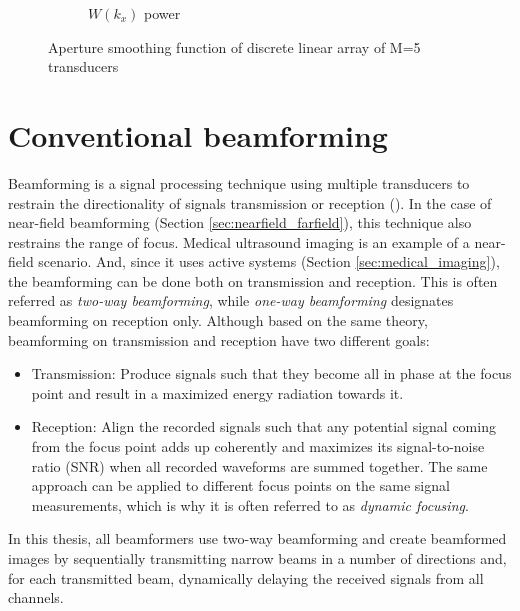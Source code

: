 \begin{figure}[ht]
\begin{subfigure}[b]{0.48\linewidth}
        \caption{$W(k_x)$ power}
    \end{subfigure}
	\caption{Aperture smoothing function of discrete linear array of M=5 transducers}
	\label{fig:total_aperture}
\end{figure}


\section{Conventional beamforming}
\label{sec:beamforming}
Beamforming is a signal processing technique using multiple transducers to restrain the directionality of signals transmission or reception (\cite{DAS}). In the case of near-field beamforming (Section \ref{sec:nearfield_farfield}), this technique also restrains the range of focus. Medical ultrasound imaging is an example of a near-field scenario. And, since it uses active systems (Section \ref{sec:medical_imaging}), the beamforming can be done both on transmission and reception. This is often referred as \textit{two-way beamforming}, while \textit{one-way beamforming} designates beamforming on reception only. Although based on the same theory, beamforming on transmission and reception have two different goals:
\begin{itemize}
    \item Transmission: Produce signals such that they become all in phase at the focus point and result in a maximized energy radiation towards it.
    \item Reception: Align the recorded signals such that any potential signal coming from the focus point adds up coherently and maximizes its signal-to-noise ratio (SNR) when all recorded waveforms are summed together. The same approach can be applied to different focus points on the same signal measurements, which is why it is often referred to as \textit{dynamic focusing}.
\end{itemize}
\noindent
In this thesis, all beamformers use two-way beamforming and create beamformed images by sequentially transmitting narrow beams in a number of directions and, for each transmitted beam, dynamically delaying the received signals from all channels.

